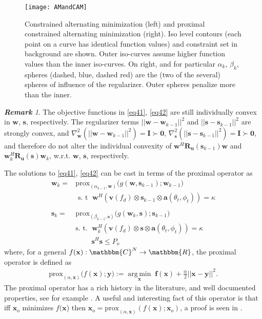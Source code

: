 \documentclass[11pt,draftclsnofoot,onecolumn]{IEEEtran}
\DeclareMathOperator*{\argmin}{arg\,min}
\theoremstyle{definition}
\theoremstyle{remark}
\newtheorem{remk}{\bf Remark}
\begin{document}
\begin{figure*}[tbp!]
\centering
\texttt{[image: AMandCAM]}
\caption{Constrained alternating minimization (left) and proximal constrained alternating minimization (right). Iso level contours (each point on a curve has identical function values) and constraint set in background are shown. Outer iso-curves assume higher function values than the inner iso-curves. On right, and for particular $\alpha_{k}$, $\beta_{k}$, spheres (dashed, blue, dashed red) are the (two of the several) spheres of influence of the regularizer. Outer spheres penalize more than the inner.}
\label{amcamfig}
\end{figure*}

\begin{remk}\label{remark2}
The objective functions in \eqref{eq41}, \eqref{eq42} are still individually convex in $\mathbf{w}$, $\mathbf{s}$, respectively.
The regularizer terms $|| \mathbf{w}-\mathbf{w}_{k-1} ||^2$ and $ ||\mathbf{s}-\mathbf{s}_{k-1} ||^2$   are strongly convex, and  $\nabla^2_{\mathbf{w}} ( || \mathbf{w}-\mathbf{w}_{k-1} ||^2)=\mathbf{I}\succ \mathbf{0}$, $\nabla^2_{\mathbf{s}} ( || \mathbf{s}-\mathbf{s}_{k-1} ||^2)=\mathbf{I} \succ \mathbf{0}$, and therefore do not alter the individual convexity of $\mathbf{w}^H\mathbf{R_u}( \mathbf{s}_{k-1})\mathbf{w}$ and $\mathbf{w}^H_{k}\mathbf{R_u}(\mathbf{s})\mathbf{w}_{k}$, w.r.t. $\mathbf{w}$, $\mathbf{s}$, respectively.
\end{remk}
The solutions to \eqref{eq41}, \eqref{eq42} can be cast in terms of the proximal operator as
 \begin{align} 
 \mathbf{w}_{k}=&\mathrm{prox}_{(\alpha_{k-1},\mathbf{w} )} \big( g(\mathbf{w},\mathbf{s}_{k-1}) ;\mathbf{w}_{k-1}  \big) \label{eq43} \\
 &\mbox{ s. t } \; \mathbf{w}^H(\mathbf{v}(f_d)\otimes\mathbf{s}_{k-1}\otimes\mathbf{a}(\theta_t,\phi_t))=\kappa \nonumber \\ 
 \nonumber  \\
 \mathbf{s}_{k}=&\mathrm{prox}_{(\beta_{k-1},\mathbf{s} )} \big( g(\mathbf{w}_{k},\mathbf{s}) ;\mathbf{s}_{k-1}  \big) \label{eq44} \\
 &\mbox{s. t. } \; \mathbf{w}^H_{k}(\mathbf{v}(f_d)\otimes\mathbf{s}\otimes\mathbf{a}(\theta_t,\phi_t))=\kappa    \nonumber \\ 
& \;\;\;\;\;\;\;\;\mathbf{s}^H \mathbf{s}\leq P_o  \nonumber
 \end{align}
where, for a general $f(\mathbf{x}):\mathbbm{C}^N\rightarrow \mathbbm{R}$, the proximal operator is defined as
\begin{align} \label{eq45}
\mathrm{prox}_{(\alpha,\mathbf{x})} \big(f(\mathbf{x});\mathbf{y} \big):= \argmin \limits_{\mathbf{x} } \; \mathbf{f} (\mathbf{x}) +\frac{\alpha}{2} ||\mathbf{x}-\mathbf{y} ||^2.
\end{align}
The proximal operator has  a rich history in the literature, and well documented properties, see for example \cite{Parikh2013,Rockafeller1973,Rockafeller1976,Bertsekas1994}. A useful and interesting fact of this operator is that iff $\mathbf{x}_{o}$ minimizes $f(\mathbf{x}$) then $\mathbf{x}_{o}=\mathrm{prox}_{(\alpha,\mathbf{x})} (f(\mathbf{x});\mathbf{x}_{o})$, a proof is seen in \cite{Parikh2013}. 
\end{document}
